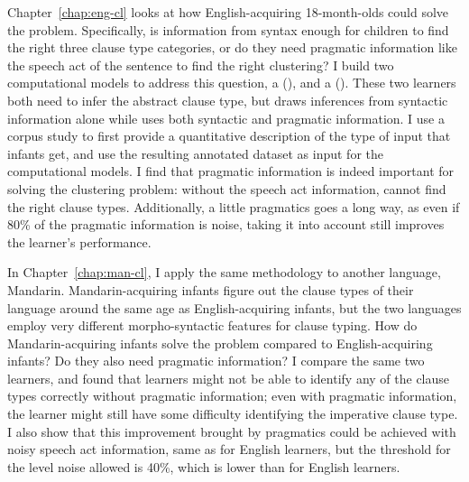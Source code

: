 Chapter~\ref{chap:eng-cl} looks at how English-acquiring 18-month-olds could solve the problem. Specifically, is information from syntax enough for children to find the right three clause type categories, or do they need pragmatic information like the speech act of the sentence to find the right clustering? I build two computational models to address this question, a \distlearner{} (\dlearnerabbr{}), and a \praglearner{} (\plearnerabbr{}). These two learners both need to infer the abstract clause type, but \dlearnerabbr{} draws inferences from syntactic information alone while \plearnerabbr{} uses both syntactic and pragmatic information. I use a corpus study to first provide a quantitative description of the type of input that infants get, and use the resulting annotated dataset as input for the computational models. I find that pragmatic information is indeed important for solving the clustering problem: without the speech act information, \dlearnerabbr{} cannot find the right clause types. Additionally, a little pragmatics goes a long way, as even if 80\% of the pragmatic information is noise, taking it into account still improves the learner's performance. 

In Chapter~\ref{chap:man-cl}, I apply the same methodology to another language, Mandarin. Mandarin-acquiring infants figure out the clause types of their language around the same age as English-acquiring infants, but the two languages employ very different morpho-syntactic features for clause typing. How do Mandarin-acquiring infants solve the problem compared to English-acquiring infants? Do they also need pragmatic information? I compare the same two learners, and found that learners might not be able to identify any of the clause types correctly without pragmatic information; even with pragmatic information, the learner might still have some difficulty identifying the imperative clause type. I also show that this improvement brought by pragmatics could be achieved with noisy speech act information, same as for English learners, but the threshold for the level noise allowed is 40\%, which is lower than for English learners.

